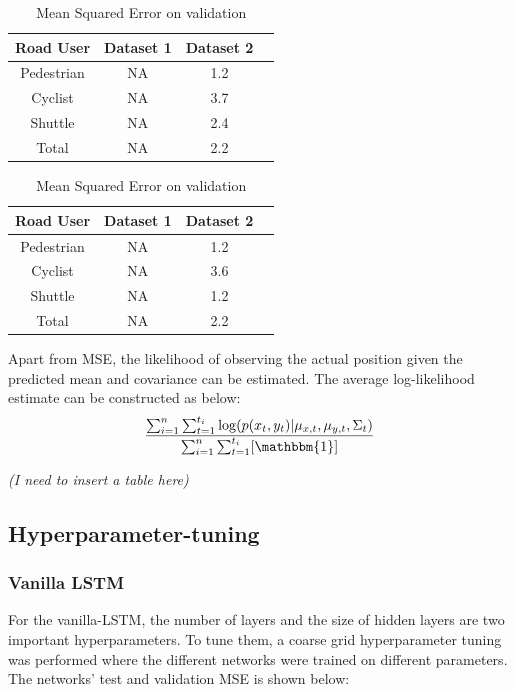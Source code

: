 \documentclass{article}
\begin{document}
\begin{table}[H]
\parbox{.45\linewidth}{
\centering
\begin{tabular}{@{}cccc@{}}
\toprule
Road User & Dataset 1 & Dataset 2 \\ \midrule
Pedestrian  & NA & 1.2 \\ 
Cyclist  & NA & 3.7 \\
Shuttle  & NA & 2.4 \\  \midrule
Total & NA & 2.2 \\    \midrule
\end{tabular}
\caption{Mean Squared Error on test}
\label{table:1}
}
\hfill
\parbox{.45\linewidth}{
\centering
\begin{tabular}{@{}cccc@{}}
\toprule
Road User & Dataset 1 & Dataset 2 \\ \midrule
Pedestrian  & NA & 1.2 \\ 
Cyclist  & NA & 3.6 \\
Shuttle  & NA & 1.2 \\  \midrule
Total & NA & 2.2 \\    \midrule
\end{tabular}
\caption{Mean Squared Error on validation}
\label{table:2}
}
\end{table}
Apart from MSE, the likelihood of observing the actual position given the predicted mean and covariance can be estimated. The average log-likelihood estimate can be constructed as below:
\begin{equation}
    \frac{\sum_{i=1}^n\sum_{t=1}^{t_i}\log(p(x_t,y_t)|\mu_{x,t},\mu_{y,t},\Sigma_t)}{\sum_{i=1}^n\sum_{t=1}^{t_i}[\mathbbm{1}]}
\end{equation}

\textit{(I need to insert a table here)}


\subsection{Hyperparameter-tuning}
\subsubsection{Vanilla LSTM}
For the vanilla-LSTM, the number of layers and the size of hidden layers are two important hyperparameters. To tune them, a coarse grid hyperparameter tuning was performed where the different networks were trained on different parameters. The networks' test and validation MSE is shown below:
\end{document}
